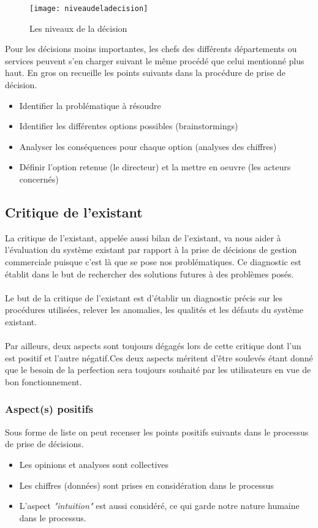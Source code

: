 \begin{figure}[H]
    \centering
    \texttt{[image: niveaudeladecision]}
    \caption{Les niveaux de la décision}
    \label{fig:niveaudeladecision}
\end{figure}


Pour les décisions moins importantes, les chefs des différents départements ou services peuvent s’en charger suivant le même procédé que celui mentionné plus haut. En gros on recueille les points suivants dans la procédure de prise de décision.
\begin{itemize}
    \item Identifier la problématique à résoudre
    \item Identifier les différentes options possibles (brainstormings)
    \item Analyser les conséquences pour chaque option (analyses des chiffres)
    \item Définir l'option retenue (le directeur) et la mettre en oeuvre (les acteurs concernés)
\end{itemize}

\subsection{Critique de l’existant}
La critique de l'existant, appelée aussi bilan de l'existant, va nous aider à l'évaluation du système existant par rapport à la prise de décisions de gestion commerciale puisque c'est là que se pose nos problématiques. Ce diagnostic est établit dans le but de rechercher des solutions futures à des problèmes posés.
\paragraph{}
Le but de la critique de l'existant est d'établir un diagnostic précis sur les procédures utilisées, relever les anomalies, les qualités et les défauts du système existant.
\paragraph{}
Par ailleurs, deux aspects sont toujours dégagés lors de cette critique dont l'un est positif et l'autre négatif.Ces deux aspects méritent d'être soulevés étant donné que le besoin de la perfection sera toujours souhaité par les utilisateurs en vue de bon fonctionnement.

\subsubsection{Aspect(s) positifs}
Sous forme de liste on peut recenser les points positifs suivants dans le processus de prise de décisions.
\begin{itemize}
    \item Les opinions et analyses sont collectives
    \item Les chiffres (données) sont prises en considération dans le processus
    \item L'aspect \textit{"intuition"} est aussi considéré, ce qui garde notre nature humaine dans le processus.
\end{itemize}

